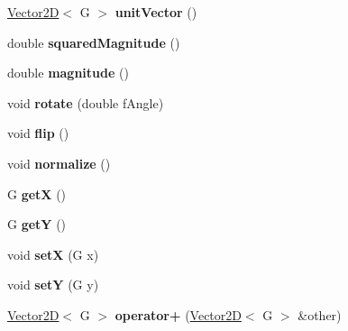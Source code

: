 \begin{DoxyCompactItemize}
\item 
\hypertarget{class_vector2_d_a1a734dd9f1ca01a88bac3f6bf2be97d0}{}\hyperlink{class_vector2_d}{Vector2\+D}$<$ G $>$ {\bfseries unit\+Vector} ()\label{class_vector2_d_a1a734dd9f1ca01a88bac3f6bf2be97d0}

\item 
\hypertarget{class_vector2_d_af4162d18ba5939bd0175ae01ad6f0221}{}double {\bfseries squared\+Magnitude} ()\label{class_vector2_d_af4162d18ba5939bd0175ae01ad6f0221}

\item 
\hypertarget{class_vector2_d_aab76e76bb642784480bdd231b90b1273}{}double {\bfseries magnitude} ()\label{class_vector2_d_aab76e76bb642784480bdd231b90b1273}

\item 
\hypertarget{class_vector2_d_a85f594928169b9c4bb74cc26ab43d111}{}void {\bfseries rotate} (double f\+Angle)\label{class_vector2_d_a85f594928169b9c4bb74cc26ab43d111}

\item 
\hypertarget{class_vector2_d_a6191843e792557d9532da82b79b026aa}{}void {\bfseries flip} ()\label{class_vector2_d_a6191843e792557d9532da82b79b026aa}

\item 
\hypertarget{class_vector2_d_a0de406dcf396cb5b629bf196c1101621}{}void {\bfseries normalize} ()\label{class_vector2_d_a0de406dcf396cb5b629bf196c1101621}

\item 
\hypertarget{class_vector2_d_a46521876fbb0b52881eba97a074ba59c}{}G {\bfseries get\+X} ()\label{class_vector2_d_a46521876fbb0b52881eba97a074ba59c}

\item 
\hypertarget{class_vector2_d_ac0ecf6cdb4b8106b8c1c2a08efc728df}{}G {\bfseries get\+Y} ()\label{class_vector2_d_ac0ecf6cdb4b8106b8c1c2a08efc728df}

\item 
\hypertarget{class_vector2_d_a6c5526343de1af297d3cc4baca03a9b1}{}void {\bfseries set\+X} (G x)\label{class_vector2_d_a6c5526343de1af297d3cc4baca03a9b1}

\item 
\hypertarget{class_vector2_d_ac7ba076a26efb04c2e590a0cdd3fd20e}{}void {\bfseries set\+Y} (G y)\label{class_vector2_d_ac7ba076a26efb04c2e590a0cdd3fd20e}

\item 
\hypertarget{class_vector2_d_ad909dd1f21da8061bf6d07b49ff34fd4}{}\hyperlink{class_vector2_d}{Vector2\+D}$<$ G $>$ {\bfseries operator+} (\hyperlink{class_vector2_d}{Vector2\+D}$<$ G $>$ \&other)\label{class_vector2_d_ad909dd1f21da8061bf6d07b49ff34fd4}


\end{DoxyCompactItemize}
